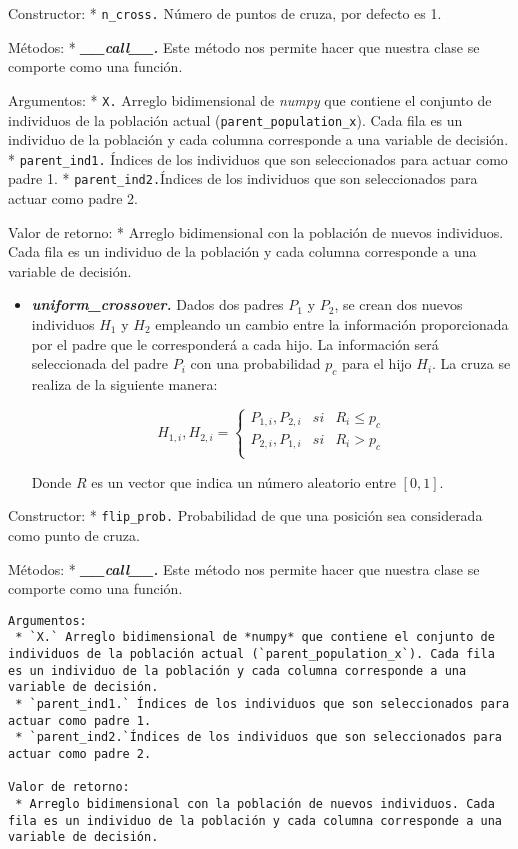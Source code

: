 \documentclass[11pt]{article}
\providecommand{\tightlist}{%
      \setlength{\itemsep}{0pt}\setlength{\parskip}{0pt}}
\begin{document}
Constructor: * \texttt{n\_cross.} Número de puntos de cruza, por defecto
es 1.

Métodos: * \emph{\textbf{\_\_call\_\_.}} Este método nos permite hacer
que nuestra clase se comporte como una función.

Argumentos: * \texttt{X.} Arreglo bidimensional de \emph{numpy} que
contiene el conjunto de individuos de la población actual
(\texttt{parent\_population\_x}). Cada fila es un individuo de la
población y cada columna corresponde a una variable de decisión. *
\texttt{parent\_ind1.} Índices de los individuos que son seleccionados
para actuar como padre 1. * \texttt{parent\_ind2.}Índices de los
individuos que son seleccionados para actuar como padre 2.

Valor de retorno: * Arreglo bidimensional con la población de nuevos
individuos. Cada fila es un individuo de la población y cada columna
corresponde a una variable de decisión.

    \begin{itemize}
\tightlist
\item
  \emph{\textbf{uniform\_crossover.}} Dados dos padres \(P_1\) y
  \(P_2\), se crean dos nuevos individuos \(H_1\) y \(H_2\) empleando un
  cambio entre la información proporcionada por el padre que le
  corresponderá a cada hijo. La información será seleccionada del padre
  \(P_{i}\) con una probabilidad \(p_c\) para el hijo \(H_i\). La cruza
  se realiza de la siguiente manera:

  \begin{equation}
  H_{1,i}, H_{2,i} =
    \begin{cases}
     P_{1,i}, P_{2,i} & si & R_i \le p_c \\
     P_{2,i}, P_{1,i} & si & R_i > p_c \\
    \end{cases}
  \end{equation}

  Donde \(R\) es un vector que indica un número aleatorio entre
  \([0,1]\).
\end{itemize}

Constructor: * \texttt{flip\_prob.} Probabilidad de que una posición sea
considerada como punto de cruza.

Métodos: * \emph{\textbf{\_\_call\_\_.}} Este método nos permite hacer
que nuestra clase se comporte como una función.

\begin{verbatim}
Argumentos:
 * `X.` Arreglo bidimensional de *numpy* que contiene el conjunto de individuos de la población actual (`parent_population_x`). Cada fila es un individuo de la población y cada columna corresponde a una variable de decisión.
 * `parent_ind1.` Índices de los individuos que son seleccionados para actuar como padre 1.
 * `parent_ind2.`Índices de los individuos que son seleccionados para actuar como padre 2.

Valor de retorno:
 * Arreglo bidimensional con la población de nuevos individuos. Cada fila es un individuo de la población y cada columna corresponde a una variable de decisión.
\end{verbatim}
\end{document}
